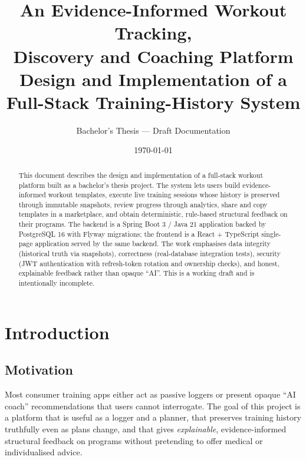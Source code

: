 \documentclass[11pt,a4paper]{article}
\title{\textbf{An Evidence-Informed Workout Tracking,\\ Discovery and Coaching Platform}\\[4pt]
\large Design and Implementation of a Full-Stack Training-History System}
\author{Bachelor's Thesis --- Draft Documentation}
\date{\today}
\begin{document}
\maketitle

\begin{abstract}
This document describes the design and implementation of a full-stack workout platform built
as a bachelor's thesis project. The system lets users build evidence-informed workout templates,
execute live training sessions whose history is preserved through immutable snapshots, review
progress through analytics, share and copy templates in a marketplace, and obtain deterministic,
rule-based structural feedback on their programs. The backend is a Spring Boot 3 / Java 21
application backed by PostgreSQL 16 with Flyway migrations; the frontend is a React + TypeScript
single-page application served by the same backend. The work emphasises data integrity
(historical truth via snapshots), correctness (real-database integration tests), security
(JWT authentication with refresh-token rotation and ownership checks), and honest, explainable
feedback rather than opaque ``AI''. This is a working draft and is intentionally incomplete.
\end{abstract}

\tableofcontents
\newpage

\section{Introduction}

\subsection{Motivation}
Most consumer training apps either act as passive loggers or present opaque ``AI coach''
recommendations that users cannot interrogate. The goal of this project is a platform that is
useful as a logger and a planner, that preserves training history truthfully even as plans
change, and that gives \emph{explainable}, evidence-informed structural feedback on programs
without pretending to offer medical or individualised advice.
\end{document}
